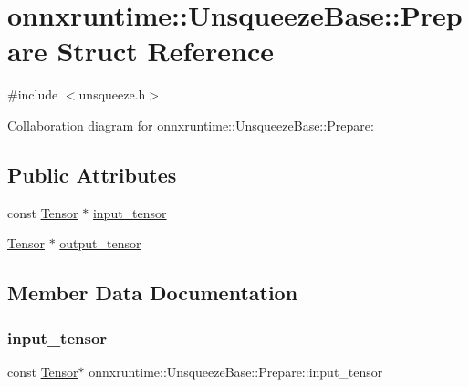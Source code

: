 \hypertarget{structonnxruntime_1_1UnsqueezeBase_1_1Prepare}{}\section{onnxruntime\+:\+:Unsqueeze\+Base\+:\+:Prepare Struct Reference}
\label{structonnxruntime_1_1UnsqueezeBase_1_1Prepare}


{\ttfamily \#include $<$unsqueeze.\+h$>$}



Collaboration diagram for onnxruntime\+:\+:Unsqueeze\+Base\+:\+:Prepare\+:
\subsection*{Public Attributes}
\begin{DoxyCompactItemize}
\item 
const \mbox{\hyperlink{classonnxruntime_1_1Tensor}{Tensor}} $\ast$ \mbox{\hyperlink{structonnxruntime_1_1UnsqueezeBase_1_1Prepare_abb2d5f3edc0626bfebaf2db63f9adfe6}{input\+\_\+tensor}}
\item 
\mbox{\hyperlink{classonnxruntime_1_1Tensor}{Tensor}} $\ast$ \mbox{\hyperlink{structonnxruntime_1_1UnsqueezeBase_1_1Prepare_a648878e7044ce11f920bd1b6bef63f54}{output\+\_\+tensor}}
\end{DoxyCompactItemize}


\subsection{Member Data Documentation}
\mbox{\label{structonnxruntime_1_1UnsqueezeBase_1_1Prepare_abb2d5f3edc0626bfebaf2db63f9adfe6}} 
\subsubsection{\texorpdfstring{input\+\_\+tensor}{input\_tensor}}
{\footnotesize\ttfamily const \mbox{\hyperlink{classonnxruntime_1_1Tensor}{Tensor}}$\ast$ onnxruntime\+::\+Unsqueeze\+Base\+::\+Prepare\+::input\+\_\+tensor}

